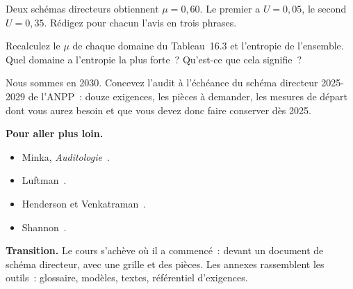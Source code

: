 \begin{boxexo}[title={\ding{45}\quad Exercice~16.3. Deux objets \niveaumoyen}]
Deux schémas directeurs obtiennent $\mu = 0{,}60$. Le premier a $U = 0{,}05$, le second $U = 0{,}35$. Rédigez pour chacun l'avis en trois phrases.
\end{boxexo}

\begin{boxexo}[title={\ding{45}\quad Exercice~16.4. Vérifier le tableau \niveaumoyen}]
Recalculez le $\mu$ de chaque domaine du Tableau~16.3 et l'entropie de l'ensemble. Quel domaine a l'entropie la plus forte~? Qu'est-ce que cela signifie~?
\end{boxexo}

\begin{boxexo}[title={\ding{45}\quad Exercice~16.5. L'audit à l'échéance \niveauexpert}]
Nous sommes en 2030. Concevez l'audit à l'échéance du schéma directeur 2025-2029 de l'ANPP~: douze exigences, les pièces à demander, les mesures de départ dont vous aurez besoin et que vous devez donc faire conserver dès 2025.
\end{boxexo}

\bigskip

\begin{boxinfo}
\textbf{Pour aller plus loin.}
\begin{itemize}
    \item Minka, \textit{Auditologie}~\cite{minka2026auditologie}.
    \item Luftman~\cite{luftman2000}.
    \item Henderson et Venkatraman~\cite{henderson1993}.
    \item Shannon~\cite{shannon1948}.
\end{itemize}
\end{boxinfo}

\begin{boxinfo}
\textbf{Transition.} Le cours s'achève où il a commencé~: devant un document de schéma directeur, avec une grille et des pièces. Les annexes rassemblent les outils~: glossaire, modèles, textes, référentiel d'exigences.
\end{boxinfo}
